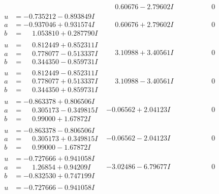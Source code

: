 \documentclass[1p]{elsarticle_modified}
\theoremstyle{definition}
\begin{document}
$$\begin{array}{c|c|c}
 & \phantom{-}0.60676 - 2.79602 I & \phantom{-0.000000 } 0 \\ \hline\begin{aligned}
u &= -0.735212 - 0.893849 I \\
a &= -0.937046 + 0.931574 I \\
b &= \phantom{-}1.053810 + 0.287790 I\end{aligned}
 & \phantom{-}0.60676 + 2.79602 I & \phantom{-0.000000 } 0 \\ \hline\begin{aligned}
u &= \phantom{-}0.812449 + 0.852311 I \\
a &= \phantom{-}0.778077 - 0.513337 I \\
b &= \phantom{-}0.344350 - 0.859731 I\end{aligned}
 & \phantom{-}3.10988 + 3.40561 I & \phantom{-0.000000 } 0 \\ \hline\begin{aligned}
u &= \phantom{-}0.812449 - 0.852311 I \\
a &= \phantom{-}0.778077 + 0.513337 I \\
b &= \phantom{-}0.344350 + 0.859731 I\end{aligned}
 & \phantom{-}3.10988 - 3.40561 I & \phantom{-0.000000 } 0 \\ \hline\begin{aligned}
u &= -0.863378 + 0.806506 I \\
a &= \phantom{-}0.305173 - 0.349815 I \\
b &= \phantom{-}0.99000 + 1.67872 I\end{aligned}
 & -0.06562 + 2.04123 I & \phantom{-0.000000 } 0 \\ \hline\begin{aligned}
u &= -0.863378 - 0.806506 I \\
a &= \phantom{-}0.305173 + 0.349815 I \\
b &= \phantom{-}0.99000 - 1.67872 I\end{aligned}
 & -0.06562 - 2.04123 I & \phantom{-0.000000 } 0 \\ \hline\begin{aligned}
u &= -0.727666 + 0.941058 I \\
a &= \phantom{-}1.26854 + 0.94209 I \\
b &= -0.832530 + 0.747199 I\end{aligned}
 & -3.02486 - 6.79677 I & \phantom{-0.000000 } 0 \\ \hline\begin{aligned}
u &= -0.727666 - 0.941058 I \\

\end{aligned}
\end{array}$$
\end{document}
